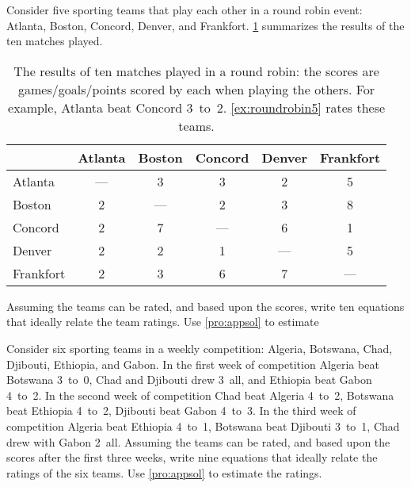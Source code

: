 \begin{exercise} \label{ex:roundrobin5} 
Consider five sporting teams that play each other in a round robin  event: Atlanta, Boston, Concord, Denver, and Frankfort.
\cref{tbl:roundrobin5} summarizes the results of the ten matches played.
\begin{table}
\caption{The results of ten matches played in a round robin: the scores are games\slash goals\slash points scored by each when playing the others.  For example, Atlanta beat Concord 3~to~2.  \cref{ex:roundrobin5} rates these teams.}
\label{tbl:roundrobin5}
\begin{center}\smallskip
\begin{tabular}{@{}l|ccccc@{}} \hline
&Atlanta& Boston& Concord& Denver&Frankfort\\ \hline
Atlanta & --- & 3 & 3 & 2 & 5 \\
Boston & 2 & --- & 2 & 3 & 8 \\
Concord & 2 & 7 & --- & 6 & 1 \\
Denver & 2 & 2 & 1 & --- & 5 \\ 
Frankfort& 2 & 3 & 6 & 7 & --- \\\hline
\end{tabular}
\end{center}
\end{table}%
Assuming the teams can be rated, and  based upon the scores, write ten equations that ideally relate the team ratings.  
Use \cref{pro:appsol} to estimate 
\end{exercise}




\begin{exercise} \label{ex:roundrobin6} 
Consider six sporting teams in a weekly competition: Algeria, Botswana, Chad, Djibouti, Ethiopia, and Gabon.
In the first week of competition 
Algeria beat Botswana 3~to~0, 
Chad and Djibouti drew 3~all, and 
Ethiopia beat Gabon 4~to~2.
In the second week of competition 
Chad beat Algeria 4~to~2, 
Botswana beat Ethiopia 4~to~2,
Djibouti beat Gabon 4~to~3.
In the third week of competition 
Algeria beat Ethiopia 4~to~1, 
Botswana beat Djibouti 3~to~1,
Chad drew with Gabon 2~all.
Assuming the teams can be rated, and  based upon the scores after the first three weeks, write nine equations that ideally relate the ratings of the six teams.  
Use \cref{pro:appsol} to estimate the ratings.
\end{exercise}



